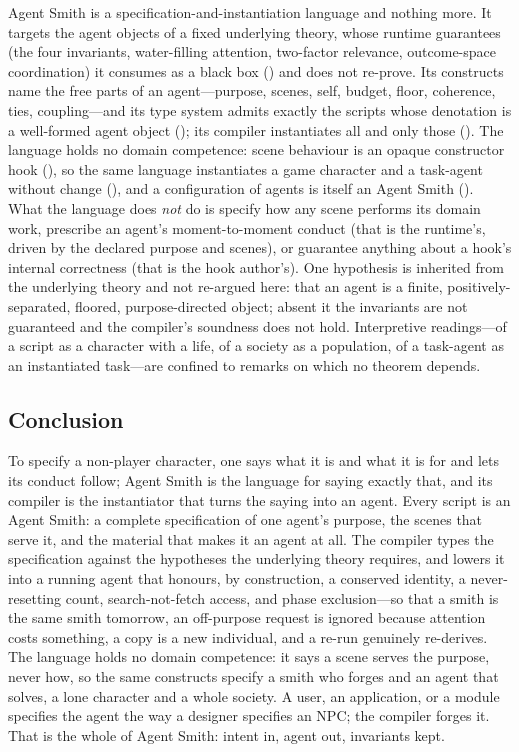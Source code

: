 \documentclass[11pt,twocolumn,a4paper]{article}
\begin{document}
Agent Smith is a specification-and-instantiation language and nothing more. It
targets the agent objects of a fixed underlying theory, whose runtime
guarantees (the four invariants, water-filling attention, two-factor
relevance, outcome-space coordination) it consumes as a black box
() and does not re-prove. Its constructs name the free parts
of an agent---purpose, scenes, self, budget, floor, coherence, ties,
coupling---and its type system admits exactly the scripts whose denotation is a
well-formed agent object (); its compiler instantiates all and
only those (). The language holds no domain competence:
scene behaviour is an opaque constructor hook (), so the
same language instantiates a game character and a task-agent without change
(), and a configuration of agents is itself an Agent Smith
(). What the language does \emph{not} do is specify how any
scene performs its domain work, prescribe an agent's moment-to-moment conduct
(that is the runtime's, driven by the declared purpose and scenes), or
guarantee anything about a hook's internal correctness (that is the hook
author's). One hypothesis is inherited from the underlying theory and not
re-argued here: that an agent is a finite, positively-separated, floored,
purpose-directed object; absent it the invariants are not guaranteed and the
compiler's soundness does not hold. Interpretive readings---of a script as a
character with a life, of a society as a population, of a task-agent as an
instantiated task---are confined to remarks on which no theorem depends.

\subsection{Conclusion}

To specify a non-player character, one says what it is and what it is for and
lets its conduct follow; Agent Smith is the language for saying exactly that,
and its compiler is the instantiator that turns the saying into an agent.
Every script is an Agent Smith: a complete specification of one agent's
purpose, the scenes that serve it, and the material that makes it an agent at
all. The compiler types the specification against the hypotheses the
underlying theory requires, and lowers it into a running agent that honours,
by construction, a conserved identity, a never-resetting count,
search-not-fetch access, and phase exclusion---so that a smith is the same
smith tomorrow, an off-purpose request is ignored because attention costs
something, a copy is a new individual, and a re-run genuinely re-derives. The
language holds no domain competence: it says a scene serves the purpose, never
how, so the same constructs specify a smith who forges and an agent that
solves, a lone character and a whole society. A user, an application, or a
module specifies the agent the way a designer specifies an NPC; the compiler
forges it. That is the whole of Agent Smith: intent in, agent out, invariants
kept.



\end{document}
